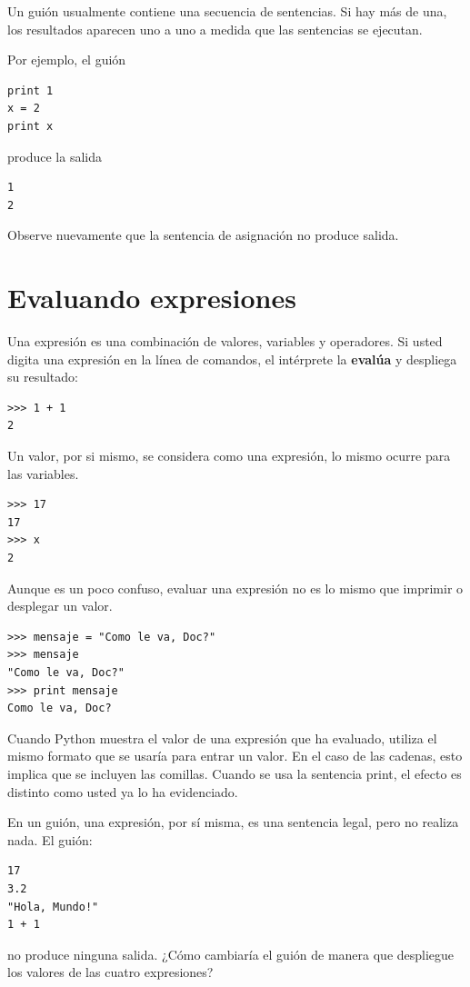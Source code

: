 Un guión usualmente contiene una secuencia de sentencias. Si hay más 
de una, los resultados aparecen uno a uno a medida que las sentencias
se ejecutan.

Por ejemplo, el guión

\beforeverb
\begin{verbatim}
print 1
x = 2
print x
\end{verbatim}
\afterverb
%
produce la salida

\beforeverb
\begin{verbatim}
1
2
\end{verbatim}
\afterverb
%
Observe nuevamente que la sentencia de asignación no produce salida.



\section{Evaluando expresiones}

Una expresión es una combinación de valores, variables y operadores.
Si usted digita una expresión en la línea de comandos, el intérprete
la {\bf evalúa} y despliega su resultado:

\beforeverb
\begin{verbatim}
>>> 1 + 1
2
\end{verbatim}
\afterverb
%
Un valor, por si mismo, se considera como una expresión, lo mismo ocurre para las variables.

\beforeverb
\begin{verbatim}
>>> 17
17
>>> x
2
\end{verbatim}
\afterverb
%
Aunque es un poco confuso, evaluar una expresión no es lo mismo que imprimir o
desplegar un valor.

\beforeverb
\begin{verbatim}
>>> mensaje = "Como le va, Doc?"
>>> mensaje
"Como le va, Doc?"
>>> print mensaje
Como le va, Doc?
\end{verbatim}
\afterverb
%
Cuando  Python  muestra el valor de una expresión que
ha evaluado, utiliza el mismo formato que se usaría para entrar un valor. 
En el caso de las cadenas, esto implica que se incluyen las
comillas. Cuando se usa la sentencia print, el efecto es distinto 
como usted ya lo ha evidenciado.

En un guión, una expresión, por sí misma, es una sentencia legal, pero no 
realiza nada. El guión:

\beforeverb
\begin{verbatim}
17
3.2
"Hola, Mundo!"
1 + 1
\end{verbatim}
\afterverb
%
no produce ninguna salida. ¿Cómo cambiaría el guión 
de manera que despliegue los valores de las cuatro expresiones?


